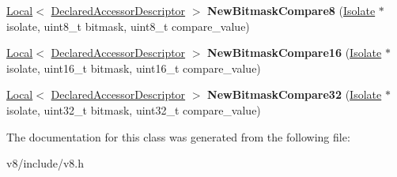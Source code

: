 \begin{DoxyCompactItemize}
\item 
\hypertarget{classv8_1_1RawOperationDescriptor_a02b9ebd9141b942ee5eaf844837b5a54}{\hyperlink{classv8_1_1Local}{Local}$<$ \hyperlink{classv8_1_1DeclaredAccessorDescriptor}{Declared\-Accessor\-Descriptor} $>$ {\bfseries New\-Bitmask\-Compare8} (\hyperlink{classv8_1_1Isolate}{Isolate} $\ast$isolate, uint8\-\_\-t bitmask, uint8\-\_\-t compare\-\_\-value)}\label{classv8_1_1RawOperationDescriptor_a02b9ebd9141b942ee5eaf844837b5a54}

\item 
\hypertarget{classv8_1_1RawOperationDescriptor_a36f50eb26b4e4fc689d3e77a3a60484d}{\hyperlink{classv8_1_1Local}{Local}$<$ \hyperlink{classv8_1_1DeclaredAccessorDescriptor}{Declared\-Accessor\-Descriptor} $>$ {\bfseries New\-Bitmask\-Compare16} (\hyperlink{classv8_1_1Isolate}{Isolate} $\ast$isolate, uint16\-\_\-t bitmask, uint16\-\_\-t compare\-\_\-value)}\label{classv8_1_1RawOperationDescriptor_a36f50eb26b4e4fc689d3e77a3a60484d}

\item 
\hypertarget{classv8_1_1RawOperationDescriptor_a4dc21ff1a6b8463c1c85db8362bb56a3}{\hyperlink{classv8_1_1Local}{Local}$<$ \hyperlink{classv8_1_1DeclaredAccessorDescriptor}{Declared\-Accessor\-Descriptor} $>$ {\bfseries New\-Bitmask\-Compare32} (\hyperlink{classv8_1_1Isolate}{Isolate} $\ast$isolate, uint32\-\_\-t bitmask, uint32\-\_\-t compare\-\_\-value)}\label{classv8_1_1RawOperationDescriptor_a4dc21ff1a6b8463c1c85db8362bb56a3}

\end{DoxyCompactItemize}


The documentation for this class was generated from the following file\-:\begin{DoxyCompactItemize}
\item 
v8/include/v8.\-h\end{DoxyCompactItemize}
